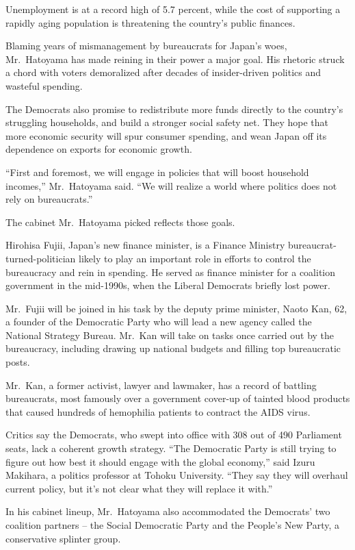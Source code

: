 ﻿\documentclass[12pt]{article}
\begin{document}
Unemployment is at a record high of 5.7 percent, while the cost of supporting a rapidly aging
population is threatening the country's public finances.

Blaming years of mismanagement by bureaucrats for Japan's woes\cite{woe}, Mr.~Hatoyama has made
reining in their power a major goal. His rhetoric struck a chord with voters demoralized after
decades of insider-driven politics and wasteful spending.

The Democrats also promise to redistribute more funds directly to the country's struggling
households, and build a stronger social safety net. They hope that more economic security will spur
consumer spending, and wean Japan off its dependence on exports for economic growth.

``First and foremost, we will engage in policies that will boost household incomes,'' Mr.~Hatoyama
said. ``We will realize a world where politics does not rely on bureaucrats.''

The cabinet Mr.~Hatoyama picked reflects those goals.

Hirohisa Fujii, Japan's new finance minister, is a Finance Ministry bureaucrat-turned-politician
likely to play an important role in efforts to control the bureaucracy and rein in spending. He
served as finance minister for a coalition government in the mid-1990s, when the Liberal Democrats
briefly lost power.

Mr.~Fujii will be joined in his task by the deputy prime minister, Naoto Kan, 62, a founder of the
Democratic Party who will lead a new agency called the National Strategy Bureau. Mr.~Kan will take
on tasks once carried out by the bureaucracy, including drawing up national budgets and filling top
bureaucratic posts.

Mr.~Kan, a former activist, lawyer and lawmaker, has a record of battling bureaucrats, most famously
over a government cover-up of tainted blood products that caused hundreds of hemophilia patients to
contract the AIDS virus.

Critics say the Democrats, who swept into office with 308 out of 490 Parliament seats, lack a
coherent growth strategy. ``The Democratic Party is still trying to figure out how best it should
engage with the global economy,'' said Izuru Makihara, a politics professor at Tohoku University.
``They say they will overhaul current policy, but it's not clear what they will replace it with.''

In his cabinet lineup, Mr.~Hatoyama also accommodated the Democrats' two coalition partners -- the
Social Democratic Party and the People's New Party, a conservative splinter group.
\end{document}
